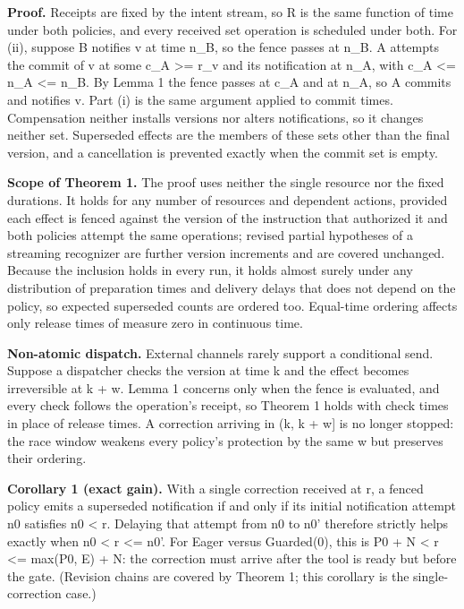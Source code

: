 \documentclass[11pt]{article}
\begin{document}
\textbf{Proof.} Receipts are fixed by the intent stream, so R is the same function of time under both policies, and every received set operation is scheduled under both. For (ii), suppose B notifies v at time n\_\allowbreak{}B, so the fence passes at n\_\allowbreak{}B. A attempts the commit of v at some c\_\allowbreak{}A >= r\_\allowbreak{}v and its notification at n\_\allowbreak{}A, with c\_\allowbreak{}A <= n\_\allowbreak{}A <= n\_\allowbreak{}B. By Lemma 1 the fence passes at c\_\allowbreak{}A and at n\_\allowbreak{}A, so A commits and notifies v. Part (i) is the same argument applied to commit times. Compensation neither installs versions nor alters notifications, so it changes neither set. Superseded effects are the members of these sets other than the final version, and a cancellation is prevented exactly when the commit set is empty.


\textbf{Scope of Theorem 1.} The proof uses neither the single resource nor the fixed durations. It holds for any number of resources and dependent actions, provided each effect is fenced against the version of the instruction that authorized it and both policies attempt the same operations; revised partial hypotheses of a streaming recognizer are further version increments and are covered unchanged. Because the inclusion holds in every run, it holds almost surely under any distribution of preparation times and delivery delays that does not depend on the policy, so expected superseded counts are ordered too. Equal-time ordering affects only release times of measure zero in continuous time.


\textbf{Non-atomic dispatch.} External channels rarely support a conditional send. Suppose a dispatcher checks the version at time k and the effect becomes irreversible at k + w. Lemma 1 concerns only when the fence is evaluated, and every check follows the operation's receipt, so Theorem 1 holds with check times in place of release times. A correction arriving in (k, k + w] is no longer stopped: the race window weakens every policy's protection by the same w but preserves their ordering.


\textbf{Corollary 1 (exact gain).} With a single correction received at r, a fenced policy emits a superseded notification if and only if its initial notification attempt n0 satisfies n0 < r. Delaying that attempt from n0 to n0' therefore strictly helps exactly when n0 < r <= n0'. For Eager versus Guarded(0), this is P0 + N < r <= max(P0, E) + N: the correction must arrive after the tool is ready but before the gate. (Revision chains are covered by Theorem 1; this corollary is the single-correction case.)
\end{document}
